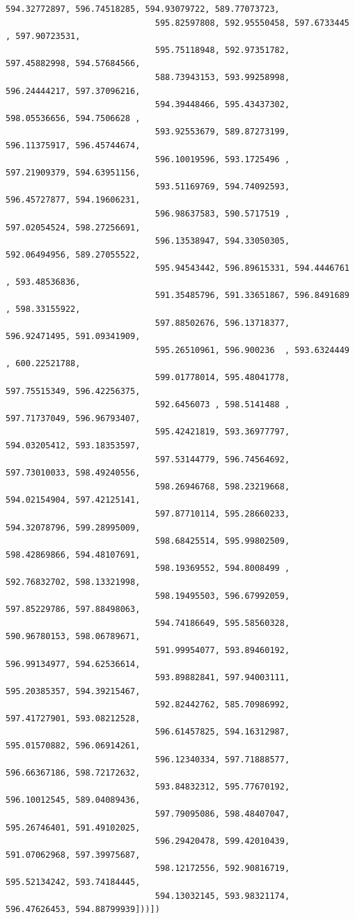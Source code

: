 \documentclass[11pt]{article}
\begin{document}
\begin{Verbatim}[commandchars=\\\{\}]
                              594.32772897, 596.74518285, 594.93079722, 589.77073723,
                              595.82597808, 592.95550458, 597.6733445 , 597.90723531,
                              595.75118948, 592.97351782, 597.45882998, 594.57684566,
                              588.73943153, 593.99258998, 596.24444217, 597.37096216,
                              594.39448466, 595.43437302, 598.05536656, 594.7506628 ,
                              593.92553679, 589.87273199, 596.11375917, 596.45744674,
                              596.10019596, 593.1725496 , 597.21909379, 594.63951156,
                              593.51169769, 594.74092593, 596.45727877, 594.19606231,
                              596.98637583, 590.5717519 , 597.02054524, 598.27256691,
                              596.13538947, 594.33050305, 592.06494956, 589.27055522,
                              595.94543442, 596.89615331, 594.4446761 , 593.48536836,
                              591.35485796, 591.33651867, 596.8491689 , 598.33155922,
                              597.88502676, 596.13718377, 596.92471495, 591.09341909,
                              595.26510961, 596.900236  , 593.6324449 , 600.22521788,
                              599.01778014, 595.48041778, 597.75515349, 596.42256375,
                              592.6456073 , 598.5141488 , 597.71737049, 596.96793407,
                              595.42421819, 593.36977797, 594.03205412, 593.18353597,
                              597.53144779, 596.74564692, 597.73010033, 598.49240556,
                              598.26946768, 598.23219668, 594.02154904, 597.42125141,
                              597.87710114, 595.28660233, 594.32078796, 599.28995009,
                              598.68425514, 595.99802509, 598.42869866, 594.48107691,
                              598.19369552, 594.8008499 , 592.76832702, 598.13321998,
                              598.19495503, 596.67992059, 597.85229786, 597.88498063,
                              594.74186649, 595.58560328, 590.96780153, 598.06789671,
                              591.99954077, 593.89460192, 596.99134977, 594.62536614,
                              593.89882841, 597.94003111, 595.20385357, 594.39215467,
                              592.82442762, 585.70986992, 597.41727901, 593.08212528,
                              596.61457825, 594.16312987, 595.01570882, 596.06914261,
                              596.12340334, 597.71888577, 596.66367186, 598.72172632,
                              593.84832312, 595.77670192, 596.10012545, 589.04089436,
                              597.79095086, 598.48407047, 595.26746401, 591.49102025,
                              596.29420478, 599.42010439, 591.07062968, 597.39975687,
                              598.12172556, 592.90816719, 595.52134242, 593.74184445,
                              594.13032145, 593.98321174, 596.47626453, 594.88799939]))])
\end{Verbatim}
            
\end{document}
